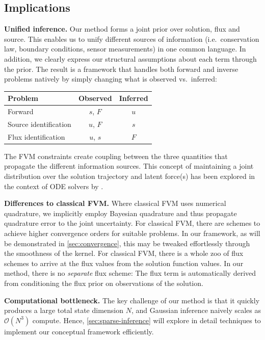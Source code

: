 \documentclass{article}
\theoremstyle{plain}
\theoremstyle{definition}
\theoremstyle{remark}
\begin{document}
\subsection{Implications}
\label{sec:implications}

\textbf{Unified inference.}
Our method forms a joint prior over solution, flux and source.
This enables us to unify different sources of information (i.e.~conservation law, boundary conditions, sensor measurements) in one common language.
In addition, we clearly express our structural assumptions about each term through the prior.
The result is a framework that handles both forward and inverse problems natively by simply changing what is observed vs.\ inferred:
\begin{center}
  \begin{tabular}{lcc}
    \toprule
    Problem               & Observed & Inferred \\
    \midrule
    Forward               & $s$, $F$ & $u$      \\
    Source identification & $u$, $F$ & $s$      \\
    Flux identification   & $u$, $s$ & $F$      \\
    \bottomrule
  \end{tabular}
\end{center}
The FVM constraints create coupling between the three quantities that propagate the different information sources.
This concept of maintaining a joint distribution over the solution trajectory and latent force(s) has been explored in the context of ODE solvers by \citet{schmidtProbabilisticStateSpace2021}.

\textbf{Differences to classical FVM.}
Where classical FVM uses numerical quadrature, we implicitly employ Bayesian quadrature and thus propagate quadrature error to the joint uncertainty.
For classical FVM, there are schemes to achieve higher convergence orders for suitable problems.
In our framework, as will be demonstrated in \cref{sec:convergence}, this may be tweaked effortlessly through the smoothness of the kernel.
For classical FVM, there is a whole zoo of flux schemes to arrive at the flux values from the solution function values.
In our method, there is no \textit{separate} flux scheme: The flux term is automatically derived from conditioning the flux prior on observations of the solution.

\textbf{Computational bottleneck.} The key challenge of our method is that it quickly produces a large total state dimension $N$, and Gaussian inference naively scales as $\mathcal{O}(N^3)$ compute.
Hence, \cref{sec:sparse-inference} will explore in detail techniques to implement our conceptual framework efficiently.
\end{document}
